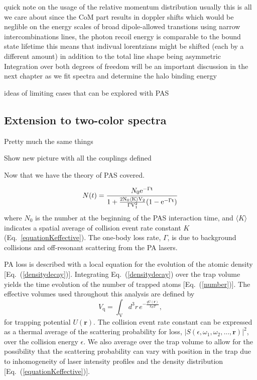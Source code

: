 quick note on the usage of the relative momentum distribution
			usually this is all we care about since the CoM part results in doppler shifts which would be neglible on the energy scales of broad dipole-allowed transtions
			using narrow intercombinations lines, the photon recoil energy is comparable to the bound state lifetime
				this means that indivual lorentzians might be shifted (each by a different amount) in addition to the total line shape being asymmetric
			Integration over both degrees of freedom will be an important discussion in the next chapter as we fit spectra and determine the halo binding energy

ideas of limiting cases that can be explored with PAS \cite{Ciuryo2004}

\subsection{Extension to two-color spectra} \label{ssec:two_color_pa}

Pretty much the same things
		
Show new picture with all the couplings defined


Now that we have the theory of PAS covered. 



\begin{equation}\label{eq:number}
   N(t)={N_0 \rm{e}^{-\Gamma t} \over 1+
   {2 N_0 \langle K \rangle V_2\over \Gamma V_1^2}(1-\rm{e}^{-\Gamma t})}
\end{equation}
where  $N_0$  is the number  at the beginning of the PAS interaction
time, and $\langle K \rangle$ indicates a spatial average of collision event rate constant $K$ (Eq.\ \ref{equationKeffective}). The one-body loss rate, $\Gamma$, is due to background
collisions and off-resonant scattering from the PA lasers.

PA loss is described with a local equation for the evolution of the atomic density [Eq.~(\ref{densitydecay})]. Integrating Eq.~(\ref{densitydecay}) over the trap volume yields the time evolution of the number of trapped atoms [Eq.~(\ref{number})]. The effective volumes used throughout this analysis are defined by
\begin{equation}\label{eq:effectivevolumes}
	V_{\text{q}}=\int_{\mathrm{V}} d^3r \, e^{-\frac{qU(\mathbf{r})}{k_{B}T}},
\end{equation}
for trapping potential $U(\mathbf{r})$. The collision event rate constant can be expressed as a thermal average of the scattering probability for loss, $\vert S(\epsilon,\omega_1,\omega_2,...,\mathbf{r})\vert^2$, over the collision energy $\epsilon$. We also average over the trap volume to allow for the possibility that the scattering probability can vary with position in the trap due to inhomogeneity of laser intensity profiles and the density distribution [Eq.~(\ref{equationKeffective})].

